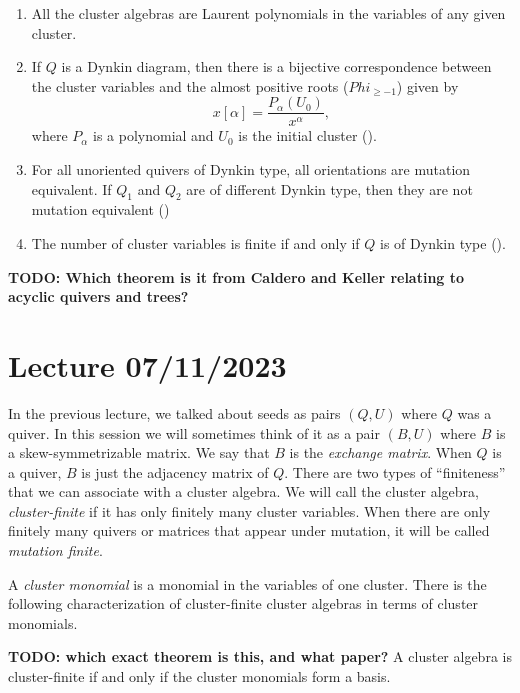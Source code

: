 \documentclass{article}
\begin{document}
\begin{theorem}
	\leavevmode
	\begin{enumerate}
		\item All the cluster algebras are Laurent polynomials in the variables of any given cluster.
		      \cite[Theorem 3.1]{FominZelevinsky2002CAF}
		\item If $Q$ is a Dynkin diagram, then there is a bijective correspondence between the
		      cluster variables and the almost positive roots ($Phi_{\geq -1}$) given by
		      \begin{equation*}
			      x[\alpha] = \frac{P_\alpha (U_0)}{x^\alpha},
		      \end{equation*}
		      where $P_\alpha$ is a polynomial and $U_0$ is the initial cluster (\cite[Theorem 1.9]{FominZelevinsky2003CAFin}).
		\item For all unoriented quivers of Dynkin type, all orientations are mutation equivalent. If
		      $Q_1$ and $Q_2$ are of different Dynkin type, then they are not mutation equivalent
		      (\cite[Theorem 1.7]{FominZelevinsky2003CAFin})
		\item The number of cluster variables is finite if and only if $Q$ is of Dynkin type
		      (\cite[Theorem 1.6]{FominZelevinsky2003CAFin}).
	\end{enumerate}
\end{theorem}

\textbf{TODO: Which theorem is it from Caldero and Keller relating to acyclic quivers and trees?}

\section{Lecture 07/11/2023}

In the previous lecture, we talked about seeds as pairs $(Q, U)$ where $Q$ was a
quiver. In this session we will sometimes think of it as a pair $(B, U)$ where $B$ is a
skew-symmetrizable matrix. We say that $B$ is the \emph{exchange matrix}. When $Q$ is a
quiver, $B$ is just the adjacency matrix of $Q$. There are two types of ``finiteness''
that we can associate with a cluster algebra. We will call the cluster algebra,
\emph{cluster-finite} if it has only finitely many cluster variables. When there are
only finitely many quivers or matrices that appear under mutation, it will be called
\emph{mutation finite}.

A \emph{cluster monomial} is a monomial in the variables of one cluster. There is the
following characterization of cluster-finite cluster algebras in terms of cluster
monomials.
\begin{theorem}
	\textbf{TODO: which exact theorem is this, and what paper?}
	A cluster algebra is cluster-finite if and only if the cluster monomials form a basis.
\end{theorem}
\end{document}
